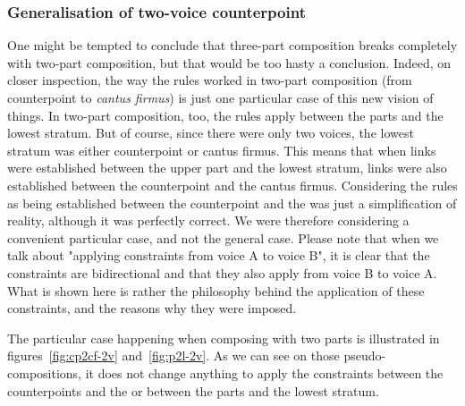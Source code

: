\subsubsection{Generalisation of two-voice counterpoint}
One might be tempted to conclude that three-part composition breaks completely with two-part composition, but that would be too hasty a conclusion. Indeed, on closer inspection, the way the rules worked in two-part composition (from counterpoint to \textit{cantus firmus}) is just one particular case of this new vision of things. In two-part composition, too, the rules apply between the parts and the lowest stratum. But of course, since there were only two voices, the lowest stratum was either counterpoint or cantus firmus. This means that when links were established between the upper part and the lowest stratum, links were also established between the counterpoint and the cantus firmus. Considering the rules as being established between the counterpoint and the \cfs was just a simplification of reality, although it was perfectly correct. We were therefore considering a convenient particular case, and not the general case. Please note that when we talk about "applying constraints from voice A to voice B", it is clear that the constraints are bidirectional and that they also apply from voice B to voice A. What is shown here is rather the philosophy behind the application of these constraints, and the reasons why they were imposed.

The particular case happening when composing with two parts is illustrated in figures~\ref{fig:cp2cf-2v} and~\ref{fig:p2l-2v}. As we can see on those pseudo-compositions, it does not change anything to apply the constraints between the counterpoints and the \cfs or between the parts and the lowest stratum.

